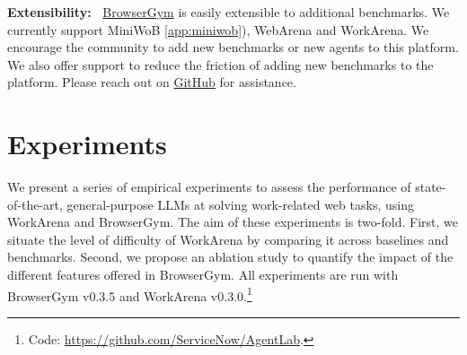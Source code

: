 \documentclass{article}
\theoremstyle{plain}
\theoremstyle{definition}
\theoremstyle{remark}
\newcommand{\paragraphtight}[1]{\textbf{#1~}}
\begin{document}
\paragraphtight{Extensibility:}
\href{https://github.com/ServiceNow/BrowserGym}{BrowserGym}
is easily extensible to additional benchmarks. We currently support MiniWoB \cref{app:miniwob}), WebArena \citep{zhou2023webarena} and WorkArena. We encourage the community to add new benchmarks or new agents to this platform. We also offer support to reduce the friction of adding new benchmarks to the platform. Please reach out on \href{https://github.com/ServiceNow/BrowserGym/discussions}{GitHub} for assistance.

\section{Experiments}
\label{sec:results}

We present a series of empirical experiments to assess the performance of state-of-the-art, general-purpose LLMs at solving work-related web tasks, using WorkArena and BrowserGym. The aim of these experiments is two-fold. First, we situate the level of difficulty of WorkArena by comparing it across baselines and benchmarks. Second, we propose an ablation study to quantify the impact of the different features offered in BrowserGym. All experiments are run with BrowserGym v0.3.5 and WorkArena v0.3.0.\footnote{Code: \url{https://github.com/ServiceNow/AgentLab}.}

\newcommand{\yes}{{\color{green}\ding{51}}}
\newcommand{\no}{{\color{red}\ding{55}}}
\end{document}
